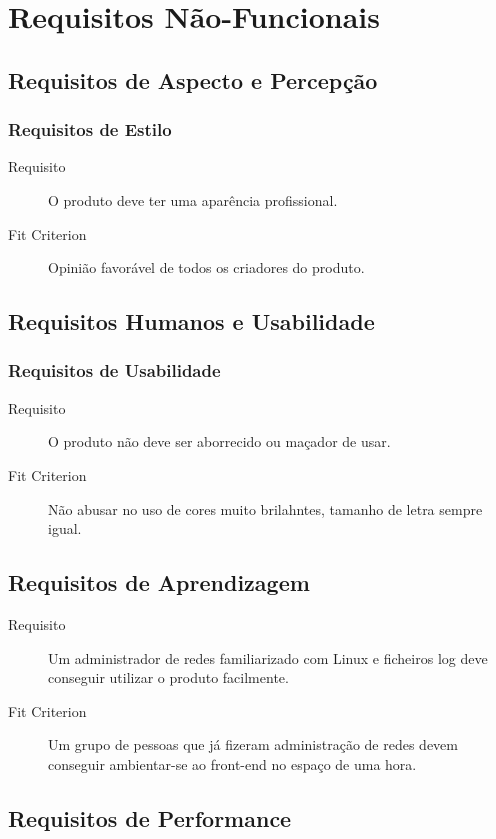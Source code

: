 \chapter{Requisitos Não-Funcionais}
\section{Requisitos de Aspecto e Percepção}
\subsection{Requisitos de Estilo}
\begin{description}
\item[Requisito] O produto deve ter uma aparência profissional.
\item[Fit Criterion] Opinião favorável de todos os criadores do produto.
\end{description}

\section{Requisitos Humanos e Usabilidade}
\subsection{Requisitos de Usabilidade}
\begin{description}
\item[Requisito] O produto não deve ser aborrecido ou maçador de usar.
\item[Fit Criterion] Não abusar no uso de cores muito brilahntes, tamanho de letra sempre igual.
\end{description}

\section{Requisitos de Aprendizagem}
\begin{description}
\item[Requisito] Um administrador de redes familiarizado com Linux e ficheiros log deve conseguir utilizar o produto facilmente.
\item[Fit Criterion] Um grupo de pessoas que já fizeram administração de redes devem conseguir ambientar-se ao front-end no espaço de uma hora.
\end{description}

\section{Requisitos de Performance}
